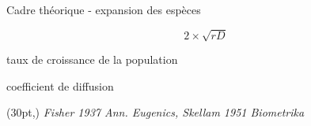 \documentclass[11pt, compress, aspectratio=1610]{beamer}
\newcommand\smallcitation[1]{%
\begin{textblock*}{\textwidth}(30pt,\textheight)
	\raggedleft \footnotesize\textit{#1}
\end{textblock*}}
\providecommand{\tightlist}{%
  \setlength{\itemsep}{0pt}\setlength{\parskip}{0pt}}
\newcommand{\stopcols}{\end{columns}}
\begin{document}

\begin{frame}{Cadre théorique - expansion des espèces}

\begin{LARGE}
$$ 2 \times \sqrt{rD} $$
\end{LARGE}

\begin{description}
\tightlist
\item[r]
taux de croissance de la population
\item[D]
coefficient de diffusion
\end{description}

\smallcitation{Fisher 1937 Ann. Eugenics, Skellam 1951 Biometrika}

\end{frame}
\end{document}
